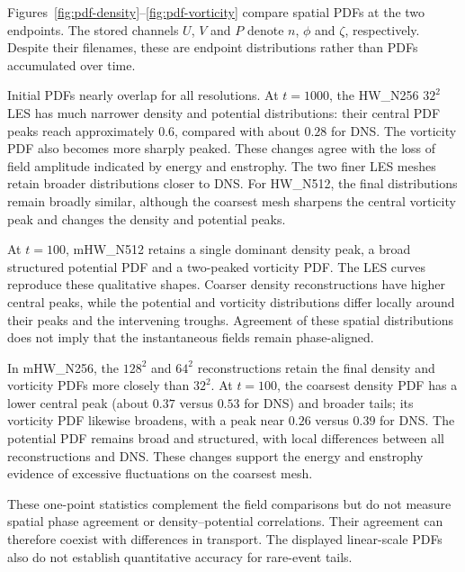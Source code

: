 \documentclass[authoryear,preprint,review,12pt]{elsarticle}
\begin{document}
Figures~\ref{fig:pdf-density}--\ref{fig:pdf-vorticity} compare spatial PDFs at the two endpoints. The stored channels $U$, $V$ and $P$ denote $n$, $\phi$ and $\zeta$, respectively. Despite their filenames, these are endpoint distributions rather than PDFs accumulated over time.

Initial PDFs nearly overlap for all resolutions. At $t=1000$, the HW\_N256 $32^2$ LES has much narrower density and potential distributions: their central PDF peaks reach approximately $0.6$, compared with about $0.28$ for DNS. The vorticity PDF also becomes more sharply peaked. These changes agree with the loss of field amplitude indicated by energy and enstrophy. The two finer LES meshes retain broader distributions closer to DNS. For HW\_N512, the final distributions remain broadly similar, although the coarsest mesh sharpens the central vorticity peak and changes the density and potential peaks.

At $t=100$, mHW\_N512 retains a single dominant density peak, a broad structured potential PDF and a two-peaked vorticity PDF. The LES curves reproduce these qualitative shapes. Coarser density reconstructions have higher central peaks, while the potential and vorticity distributions differ locally around their peaks and the intervening troughs. Agreement of these spatial distributions does not imply that the instantaneous fields remain phase-aligned.

In mHW\_N256, the $128^2$ and $64^2$ reconstructions retain the final density and vorticity PDFs more closely than $32^2$. At $t=100$, the coarsest density PDF has a lower central peak (about $0.37$ versus $0.53$ for DNS) and broader tails; its vorticity PDF likewise broadens, with a peak near $0.26$ versus $0.39$ for DNS. The potential PDF remains broad and structured, with local differences between all reconstructions and DNS. These changes support the energy and enstrophy evidence of excessive fluctuations on the coarsest mesh.

These one-point statistics complement the field comparisons but do not measure spatial phase agreement or density--potential correlations. Their agreement can therefore coexist with differences in transport. The displayed linear-scale PDFs also do not establish quantitative accuracy for rare-event tails.
\end{document}
